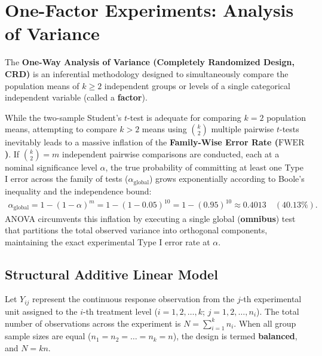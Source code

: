 \section{One-Factor Experiments: Analysis of Variance}

The \textbf{One-Way Analysis of Variance (Completely Randomized Design, CRD)} is an inferential methodology designed to simultaneously compare the population means of $k \geq 2$ independent groups or levels of a single categorical independent variable (called a \textbf{factor}).

While the two-sample Student's $t$-test is adequate for comparing $k=2$ population means, attempting to compare $k > 2$ means using $\binom{k}{2}$ multiple pairwise $t$-tests inevitably leads to a massive inflation of the \textbf{Family-Wise Error Rate ($\text{FWER}$)}. If $\binom{k}{2} = m$ independent pairwise comparisons are conducted, each at a nominal significance level $\alpha$, the true probability of committing at least one Type I error across the family of tests ($\alpha_{\text{global}}$) grows exponentially according to Boole's inequality and the independence bound:
\begin{align}
	\alpha_{\text{global}} = 1 - (1 - \alpha)^m = 1 - (1 - 0.05)^{10} = 1 - (0.95)^{10} \approx 0.4013 \quad (40.13\%).
\end{align}
ANOVA circumvents this inflation by executing a single global (\textbf{omnibus}) test that partitions the total observed variance into orthogonal components, maintaining the exact experimental Type I error rate at $\alpha$.

\subsection{Structural Additive Linear Model}

Let $Y_{ij}$ represent the continuous response observation from the $j$-th experimental unit assigned to the $i$-th treatment level ($i = 1, 2, \dots, k$; $j = 1, 2, \dots, n_i$). The total number of observations across the experiment is $N = \sum_{i=1}^k n_i$. When all group sample sizes are equal ($n_1 = n_2 = \dots = n_k = n$), the design is termed \textbf{balanced}, and $N = kn$.

